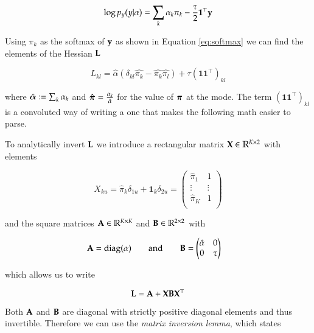 \begin{equation}
    \log p_y(y|\alpha) = \sum_k \alpha_k \pi_k - \frac{\tau}{2} \mathbf{1}^\top {\mathbf{y}}
\end{equation}

Using $\pi_k$ as the softmax of $\mathbf{y}$ as shown in Equation \ref{eq:softmax} we can find the elements of the Hessian ${\mathbf{L}}$

\begin{equation}
    L_{kl} = \hat{\alpha}(\delta_{kl}\hat{\pi_k} - \hat{\pi_k} \hat{\pi_l}) + \tau(\mathbf{1}\mathbf{1}^\top)_{kl}
\end{equation}

where $\hat{{\boldsymbol{\alpha}}} := \sum_k \alpha_k$ and $\hat{\boldsymbol{\pi}} = \frac{\alpha_k}{\hat{\alpha}}$ for the value
of $\boldsymbol{\pi}$ at the mode. The term $(\mathbf{1}\mathbf{1}^\top)_{kl}$ is a convoluted way of writing a one that makes the following math easier to parse. 

To analytically invert ${\mathbf{L}}$ we introduce a rectangular matrix ${\mathbf{X}} \in \mathbb{R}^{K\times 2}$ with elements

\begin{equation}
	X_{ku} = \hat{\pi}_k\delta_{1u} + \mathbf{1}_k\delta_{2u} = \begin{pmatrix}
		\hat{\pi}_1 & 1 \\
		\vdots & \vdots \\
		\hat{\pi}_K & 1 \\
	\end{pmatrix}
\end{equation}

and the square matrices ${\mathbf{A}} \in \mathbb{R}^{K\times K}$ and ${\mathbf{B}} \in \mathbb{R}^{2 \times 2}$ with 

\begin{align}
	{\mathbf{A}} &= \text{diag}(\alpha)  \qquad\text{and}\qquad {\mathbf{B}} = \begin{pmatrix}
		\hat{\alpha} & 0 \\
		0 & \tau
	\end{pmatrix}
\end{align}

which allows us to write 

\begin{equation}
	{\mathbf{L}} = {\mathbf{A}} + {\mathbf{X}}{\mathbf{B}}{\mathbf{X}}^\top
\end{equation}

Both ${\mathbf{A}}$ and ${\mathbf{B}}$ are diagonal with strictly positive diagonal elements and thus invertible. Therefore we can use the \textit{matrix inversion lemma}, which states

